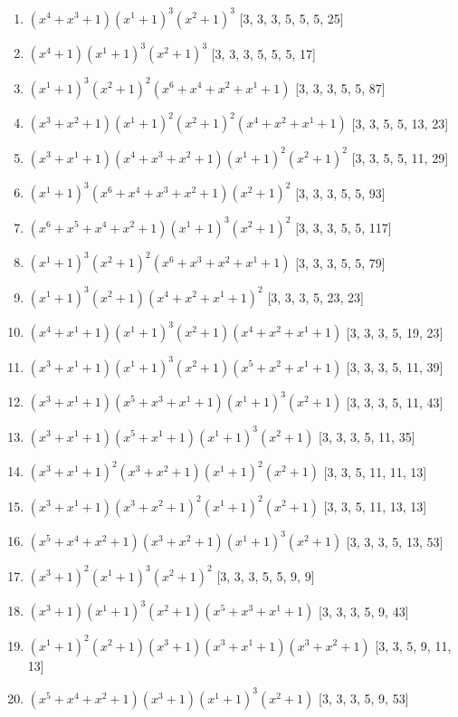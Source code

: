 \documentclass[10pt,twocolumn]{article}
\begin{document}
\begin{enumerate}
\item $(x^{4} + x^{3} + 1)(x^{1} + 1)^{3}(x^{2} + 1)^{3}$  [3, 3, 3, 5, 5, 5, 25]
\item $(x^{4} + 1)(x^{1} + 1)^{3}(x^{2} + 1)^{3}$  [3, 3, 3, 5, 5, 5, 17]
\item $(x^{1} + 1)^{3}(x^{2} + 1)^{2}(x^{6} + x^{4} + x^{2} + x^{1} + 1)$  [3, 3, 3, 5, 5, 87]
\item $(x^{3} + x^{2} + 1)(x^{1} + 1)^{2}(x^{2} + 1)^{2}(x^{4} + x^{2} + x^{1} + 1)$  [3, 3, 5, 5, 13, 23]
\item $(x^{3} + x^{1} + 1)(x^{4} + x^{3} + x^{2} + 1)(x^{1} + 1)^{2}(x^{2} + 1)^{2}$  [3, 3, 5, 5, 11, 29]
\item $(x^{1} + 1)^{3}(x^{6} + x^{4} + x^{3} + x^{2} + 1)(x^{2} + 1)^{2}$  [3, 3, 3, 5, 5, 93]
\item $(x^{6} + x^{5} + x^{4} + x^{2} + 1)(x^{1} + 1)^{3}(x^{2} + 1)^{2}$  [3, 3, 3, 5, 5, 117]
\item $(x^{1} + 1)^{3}(x^{2} + 1)^{2}(x^{6} + x^{3} + x^{2} + x^{1} + 1)$  [3, 3, 3, 5, 5, 79]
\item $(x^{1} + 1)^{3}(x^{2} + 1)(x^{4} + x^{2} + x^{1} + 1)^{2}$  [3, 3, 3, 5, 23, 23]
\item $(x^{4} + x^{1} + 1)(x^{1} + 1)^{3}(x^{2} + 1)(x^{4} + x^{2} + x^{1} + 1)$  [3, 3, 3, 5, 19, 23]
\item $(x^{3} + x^{1} + 1)(x^{1} + 1)^{3}(x^{2} + 1)(x^{5} + x^{2} + x^{1} + 1)$  [3, 3, 3, 5, 11, 39]
\item $(x^{3} + x^{1} + 1)(x^{5} + x^{3} + x^{1} + 1)(x^{1} + 1)^{3}(x^{2} + 1)$  [3, 3, 3, 5, 11, 43]
\item $(x^{3} + x^{1} + 1)(x^{5} + x^{1} + 1)(x^{1} + 1)^{3}(x^{2} + 1)$  [3, 3, 3, 5, 11, 35]
\item $(x^{3} + x^{1} + 1)^{2}(x^{3} + x^{2} + 1)(x^{1} + 1)^{2}(x^{2} + 1)$  [3, 3, 5, 11, 11, 13]
\item $(x^{3} + x^{1} + 1)(x^{3} + x^{2} + 1)^{2}(x^{1} + 1)^{2}(x^{2} + 1)$  [3, 3, 5, 11, 13, 13]
\item $(x^{5} + x^{4} + x^{2} + 1)(x^{3} + x^{2} + 1)(x^{1} + 1)^{3}(x^{2} + 1)$  [3, 3, 3, 5, 13, 53]
\item $(x^{3} + 1)^{2}(x^{1} + 1)^{3}(x^{2} + 1)^{2}$  [3, 3, 3, 5, 5, 9, 9]
\item $(x^{3} + 1)(x^{1} + 1)^{3}(x^{2} + 1)(x^{5} + x^{3} + x^{1} + 1)$  [3, 3, 3, 5, 9, 43]
\item $(x^{1} + 1)^{2}(x^{2} + 1)(x^{3} + 1)(x^{3} + x^{1} + 1)(x^{3} + x^{2} + 1)$  [3, 3, 5, 9, 11, 13]
\item $(x^{5} + x^{4} + x^{2} + 1)(x^{3} + 1)(x^{1} + 1)^{3}(x^{2} + 1)$  [3, 3, 3, 5, 9, 53]

\end{enumerate}
\end{document}
